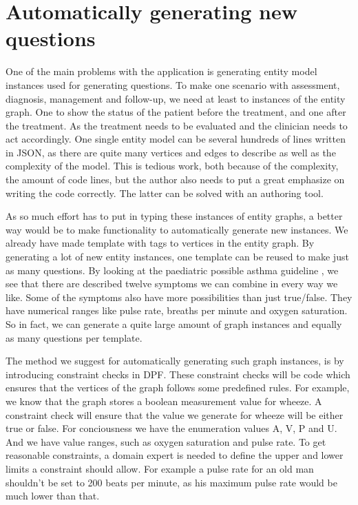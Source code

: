  
\section{Automatically generating new questions}
One of the main problems with the application is generating entity model instances used for generating questions. To make one scenario with assessment, diagnosis, management and follow-up, we need at least to instances of the entity graph. One to show the status of the patient before the treatment, and one after the treatment. As the treatment needs to be evaluated and the clinician needs to act accordingly. One single entity model can be several hundreds of lines written in JSON, as there are quite many vertices and edges to describe as well as the complexity of the model. This is tedious work, both because of the complexity, the amount of code lines, but the author also needs to put a great emphasize on writing the code correctly. The latter can be solved with an authoring tool.

As so much effort has to put in typing these instances of entity graphs, a better way would be to make functionality to automatically generate new instances. We already have made template with tags to vertices in the entity graph. By generating a lot of new entity instances, one template can be reused to make just as many questions. By looking at the paediatric possible asthma guideline \parencite{RepublicofKeny2016}, we see that there are described twelve symptoms we can combine in every way we like. Some of the symptoms also have more possibilities than just true/false. They have numerical ranges like pulse rate, breaths per minute and oxygen saturation. So in fact, we can generate a quite large amount of graph instances and equally as many questions per template.



The method we suggest for automatically generating such graph instances, is by introducing constraint checks in DPF. These constraint checks will be code which ensures that the vertices of the graph follows some predefined rules. For example, we know that the graph stores a boolean measurement value for wheeze. A constraint check will ensure that the value we generate for wheeze will be either true or false. For conciousness we have the enumeration values A, V, P and U. And we have value ranges, such as oxygen saturation and pulse rate. To get reasonable  constraints, a domain expert is needed to define the upper and lower limits a constraint should allow. For example a pulse rate for an old man shouldn't be set to 200 beats per minute, as his maximum pulse rate would be much lower than that.

